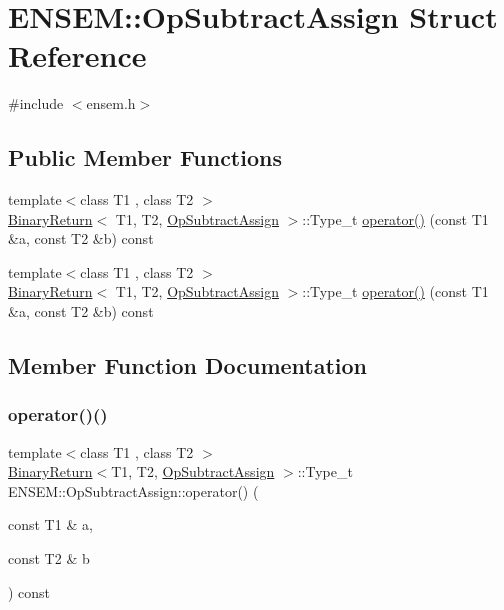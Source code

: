 \hypertarget{structENSEM_1_1OpSubtractAssign}{}\section{E\+N\+S\+EM\+:\+:Op\+Subtract\+Assign Struct Reference}
\label{structENSEM_1_1OpSubtractAssign}


{\ttfamily \#include $<$ensem.\+h$>$}

\subsection*{Public Member Functions}
\begin{DoxyCompactItemize}
\item 
{\footnotesize template$<$class T1 , class T2 $>$ }\\\mbox{\hyperlink{structENSEM_1_1BinaryReturn}{Binary\+Return}}$<$ T1, T2, \mbox{\hyperlink{structENSEM_1_1OpSubtractAssign}{Op\+Subtract\+Assign}} $>$\+::Type\+\_\+t \mbox{\hyperlink{structENSEM_1_1OpSubtractAssign_a8de7df08fa13e2efc8c47c28b8b17887}{operator()}} (const T1 \&a, const T2 \&b) const
\item 
{\footnotesize template$<$class T1 , class T2 $>$ }\\\mbox{\hyperlink{structENSEM_1_1BinaryReturn}{Binary\+Return}}$<$ T1, T2, \mbox{\hyperlink{structENSEM_1_1OpSubtractAssign}{Op\+Subtract\+Assign}} $>$\+::Type\+\_\+t \mbox{\hyperlink{structENSEM_1_1OpSubtractAssign_a8de7df08fa13e2efc8c47c28b8b17887}{operator()}} (const T1 \&a, const T2 \&b) const
\end{DoxyCompactItemize}


\subsection{Member Function Documentation}
\mbox{\label{structENSEM_1_1OpSubtractAssign_a8de7df08fa13e2efc8c47c28b8b17887}} 
\subsubsection{\texorpdfstring{operator()()}{operator()()}\hspace{0.1cm}{\footnotesize\ttfamily [1/2]}}
{\footnotesize\ttfamily template$<$class T1 , class T2 $>$ \\
\mbox{\hyperlink{structENSEM_1_1BinaryReturn}{Binary\+Return}}$<$T1, T2, \mbox{\hyperlink{structENSEM_1_1OpSubtractAssign}{Op\+Subtract\+Assign}} $>$\+::Type\+\_\+t E\+N\+S\+E\+M\+::\+Op\+Subtract\+Assign\+::operator() (\begin{DoxyParamCaption}\item[{const T1 \&}]{a,  }\item[{const T2 \&}]{b }\end{DoxyParamCaption}) const\hspace{0.3cm}{\ttfamily [inline]}}

